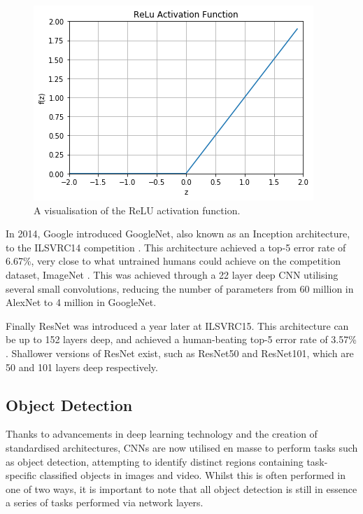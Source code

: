 \begin{figure}
	\begin{center}
		\includegraphics[scale=0.6]{Chapter2/figs/relu.png}
	\end{center}
	\caption{A visualisation of the ReLU activation function.}
	\label{fig:relu}
\end{figure}

 In 2014, Google introduced GoogleNet, also known as an Inception architecture, to the ILSVRC14 competition \cite{szegedy_going_2015}. This architecture achieved a top-5 error rate of 6.67\%, very close to what untrained humans could achieve on the competition dataset, ImageNet \cite{krizhevsky_imagenet_2012}. This was achieved through a 22 layer deep CNN utilising several small convolutions, reducing the number of parameters from 60 million in AlexNet to 4 million in GoogleNet. 

Finally ResNet was introduced a year later at ILSVRC15. This architecture can be up to 152 layers deep, and achieved a human-beating top-5 error rate of 3.57\% \cite{he_deep_2015}. Shallower versions of ResNet exist, such as ResNet50 and ResNet101, which are 50 and 101 layers deep respectively.

\subsection{Object Detection}\label{ch:Background,sec:objectDetection}

Thanks to advancements in deep learning technology and the creation of standardised architectures, CNNs are now utilised en masse to perform tasks such as object detection, attempting to identify distinct regions containing task-specific classified objects in images and video. Whilst this is often performed in one of two ways, it is important to note that all object detection is still in essence a series of tasks performed via network layers. 

